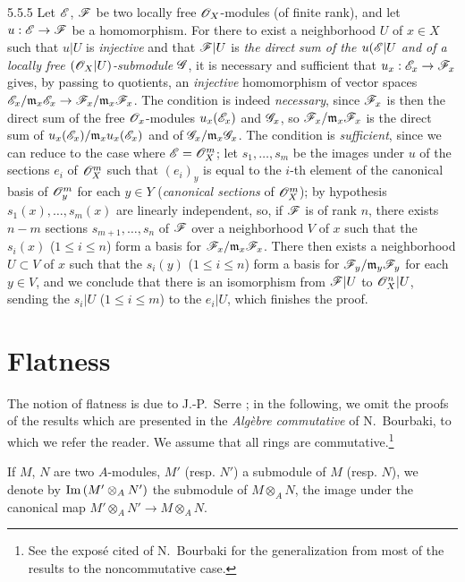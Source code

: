 \begin{env}{5.5.5}
\label{env-0.5.5.5}
Let $\mathscr{E}$, $\mathscr{F}$ be two locally free $\mathscr{O}_X$-modules (of finite rank), and let
$u:\mathscr{E}\to\mathscr{F}$ be a homomorphism. For there to exist a neighborhood $U$ of $x\in X$ such
that $u|U$ is \emph{injective} and that $\mathscr{F}|U$ is \emph{the direct sum of the
$u(\mathscr{E}|U$ and of a locally free $(\mathscr{O}_X|U)$-submodule $\mathscr{G}$}, it is necessary and
sufficient that $u_x:\mathscr{E}_x\to\mathscr{F}_x$ gives, by passing to quotients, an \emph{injective}
homomorphism of vector spaces
$\mathscr{E}_x/\mathfrak{m}_x\mathscr{E}_x\to\mathscr{F}_x/\mathfrak{m}_x\mathscr{F}_x$. The condition is indeed
\emph{necessary}, since $\mathscr{F}_x$ is then the direct sum of the free $\mathscr{O}_x$-modules
$u_x(\mathscr{E}_x)$ and $\mathscr{G}_x$, so $\mathscr{F}_x/\mathfrak{m}_x\mathscr{F}_x$ is the direct sum of
$u_x(\mathscr{E}_x)/\mathfrak{m}_x u_x(\mathscr{E}_x)$ and of $\mathscr{G}_x/\mathfrak{m}_x\mathscr{G}_x$. The
condition is \emph{sufficient}, since we can reduce to the case where $\mathscr{E}=\mathscr{O}_X^m$; let
$s_1,\dots,s_m$ be the images under $u$ of the sections $e_i$ of $\mathscr{O}_X^m$ such that
$(e_i)_y$ is equal to the $i$-th element of the canonical basis of $\mathscr{O}_y^m$ for each
$y\in Y$ (\emph{canonical sections} of $\mathscr{O}_X^m$); by hypothesis $s_1(x),\dots,s_m(x)$ are
linearly independent, so, if $\mathscr{F}$ is of rank $n$, there exists $n-m$ sections
$s_{m+1},\dots,s_n$ of $\mathscr{F}$ over a neighborhood $V$ of $x$ such that the $s_i(x)$
($1\leqslant i\leqslant n$) form a basis for $\mathscr{F}_x/\mathfrak{m}_x\mathscr{F}_x$. There then
exists  a neighborhood $U\subset V$ of $x$ such that the $s_i(y)$
($1\leqslant i\leqslant n$) form a basis for $\mathscr{F}_y/\mathfrak{m}_y\mathscr{F}_y$ for each
$y\in V$, and we conclude  that there is an isomorphism from $\mathscr{F}|U$ to
$\mathscr{O}_X^n|U$, sending the $s_i|U$ ($1\leqslant i\leqslant m$) to the $e_i|U$, which finishes
the proof.
\end{env}

\section{Flatness}
\label{0-prelim-6}

\begin{env}{6.0}
\label{env-0.6.0.0}
The notion of flatness is due to J.-P.~Serre \cite{16}; in the following, we omit the
proofs of the results which are presented in the \emph{Alg\`ebre commutative} of N.~Bourbaki,
to which we refer the reader. We assume that all rings are commutative.\footnote{See the
expos\'e cited of N.~Bourbaki for the generalization from most of the results to the
noncommutative case.}

If $M$, $N$ are two $A$-modules, $M'$ (resp. $N'$) a submodule of $M$ (resp. $N$), we denote
by ${\mathop{\mathrm{Im}}\nolimits}\,(M'\otimes_A N')$ the submodule of $M\otimes_A N$, the image under the canonical map
$M'\otimes_A N'\to M\otimes_A N$.
\end{env}

